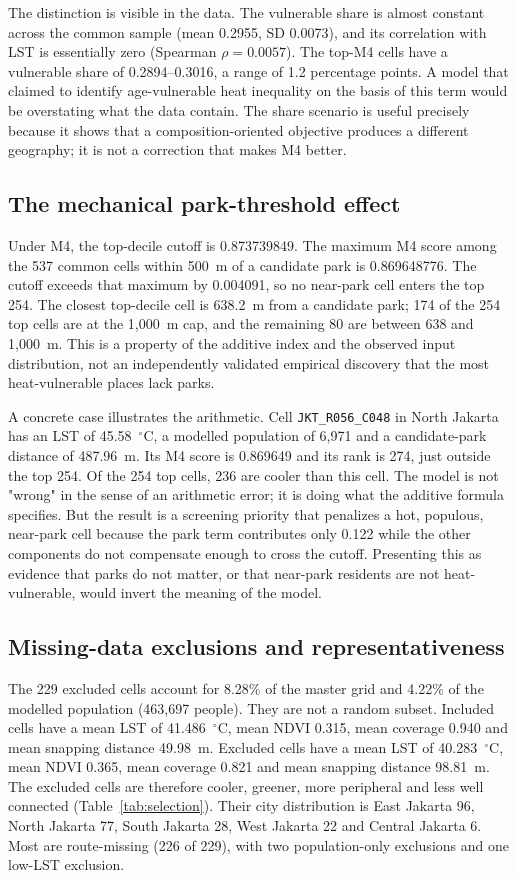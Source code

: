 \documentclass[times,twoside]{_Templates/MultiTargetManuscript}
\begin{document}
The distinction is visible in the data. The vulnerable share is almost constant
across the common sample (mean 0.2955, SD 0.0073), and its correlation with LST
is essentially zero (Spearman $\rho=0.0057$). The top-M4 cells have a vulnerable
share of 0.2894--0.3016, a range of 1.2 percentage points. A model that claimed to
identify age-vulnerable heat inequality on the basis of this term would be
overstating what the data contain. The share scenario is useful precisely because
it shows that a composition-oriented objective produces a different geography;
it is not a correction that makes M4 better.

\subsection{The mechanical park-threshold effect}

Under M4, the top-decile cutoff is 0.873739849. The maximum M4
score among the 537 common cells within 500~m of a candidate park is 0.869648776.
The cutoff exceeds that maximum by 0.004091, so no near-park cell enters the top
254. The closest top-decile cell is 638.2~m from a candidate park; 174 of the 254
top cells are at the 1,000~m cap, and the remaining 80 are between 638 and
1,000~m. This is a property of the additive index and the observed input
distribution, not an independently validated empirical discovery that the most
heat-vulnerable places lack parks.

A concrete case illustrates the arithmetic. Cell \texttt{JKT\_R056\_C048} in
North Jakarta has an LST of 45.58~$^\circ$C, a modelled population of 6,971 and a
candidate-park distance of 487.96~m. Its M4 score is 0.869649 and its rank is 274,
just outside the top 254. Of the 254 top cells, 236 are cooler than this cell.
The model is not "wrong" in the sense of an arithmetic error; it is doing what
the additive formula specifies. But the result is a screening priority that
penalizes a hot, populous, near-park cell because the park term contributes only
0.122 while the other components do not compensate enough to cross the cutoff.
Presenting this as evidence that parks do not matter, or that near-park
residents are not heat-vulnerable, would invert the meaning of the model.

\subsection{Missing-data exclusions and representativeness}

The 229 excluded cells account for 8.28\% of the master grid and 4.22\% of the
modelled population (463,697 people). They are not a random subset. Included
cells have a mean LST of 41.486~$^\circ$C, mean NDVI 0.315, mean coverage 0.940
and mean snapping distance 49.98~m. Excluded cells have a mean LST of
40.283~$^\circ$C, mean NDVI 0.365, mean coverage 0.821 and mean snapping distance
98.81~m. The excluded cells are therefore cooler, greener, more peripheral and
less well connected (Table~\ref{tab:selection}). Their city distribution is East Jakarta 96, North Jakarta
77, South Jakarta 28, West Jakarta 22 and Central Jakarta 6. Most are
route-missing (226 of 229), with two population-only exclusions and one low-LST
exclusion.
\end{document}
